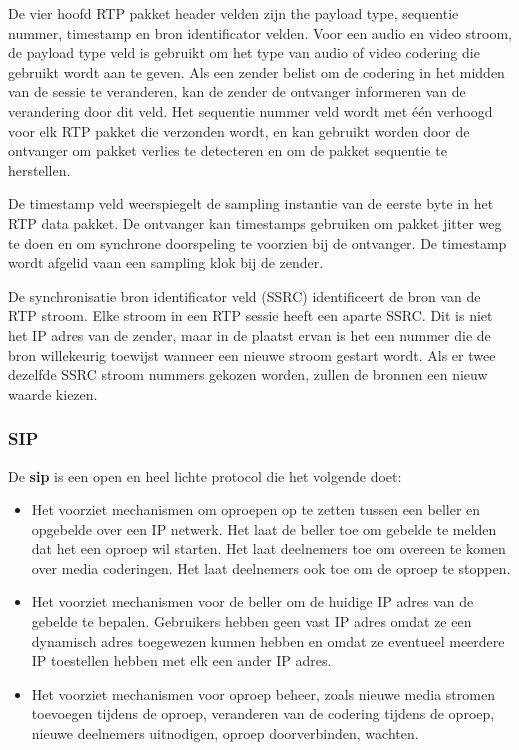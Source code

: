 
\noindent De vier hoofd RTP pakket header velden zijn the payload type, sequentie nummer, timestamp en bron identificator velden. Voor een audio en video stroom, de payload type veld is gebruikt om het type van audio of video codering die gebruikt wordt aan te geven. Als een zender belist om de codering in het midden van de sessie te veranderen, kan de zender de ontvanger informeren van de verandering door dit veld. 
Het sequentie nummer veld wordt met één verhoogd voor elk RTP pakket die verzonden wordt, en kan gebruikt worden door de ontvanger om pakket verlies te detecteren en om de pakket sequentie te herstellen. 

\noindent De timestamp veld weerspiegelt de sampling instantie van de eerste byte in het RTP data pakket. De ontvanger kan timestamps gebruiken om pakket jitter weg te doen en om synchrone doorspeling te voorzien bij de ontvanger. De timestamp wordt afgelid vaan een sampling klok bij de zender.

\noindent De synchronisatie bron identificator veld (SSRC) identificeert de bron van de RTP stroom. Elke stroom in een RTP sessie heeft een aparte SSRC. Dit is niet het IP adres van de zender, maar in de plaatst ervan is het een nummer die de bron willekeurig toewijst wanneer een nieuwe stroom gestart wordt. Als er twee dezelfde SSRC stroom nummers gekozen worden, zullen de bronnen een nieuw waarde kiezen.

\subsubsection{SIP}

\noindent De \textbf{\acrfull{sip}} is een open en heel lichte protocol die het volgende doet:

\begin{itemize}
\item Het voorziet mechanismen om oproepen op te zetten tussen een beller en opgebelde over een IP netwerk. Het laat de beller toe om gebelde te melden dat het een oproep wil starten. Het laat deelnemers toe om overeen te komen over media coderingen. Het laat deelnemers ook toe om de oproep te stoppen.
\item Het voorziet mechanismen voor de beller om de huidige IP adres van de gebelde te bepalen. Gebruikers hebben geen vast IP adres omdat ze een dynamisch adres toegewezen kunnen hebben en omdat ze eventueel meerdere IP toestellen hebben met elk een ander IP adres.
\item Het voorziet mechanismen voor oproep beheer, zoals nieuwe media stromen toevoegen tijdens de oproep, veranderen van de codering tijdens de oproep, nieuwe deelnemers uitnodigen, oproep doorverbinden, wachten.
\end{itemize}



